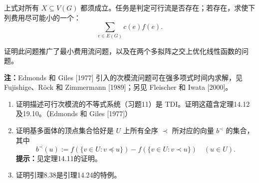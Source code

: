 上式对所有 $X\subseteq V(G)$ 都须成立。任务是判定可行流是否存在；若存在，求使下列费用尽可能小的一个：
\[\sum_{e\in E(G)}c(e)f(e).\]
\par 证明此问题推广了最小费用流问题，以及在两个多拟阵之交上优化线性函数的问题。
\par \textbf{注：}Edmonds 和 Giles [1977] 引入的次模流问题可在强多项式时间内求解，见 Fujishige、Röck 和 Zimmermann [1989]；另见 Fleischer 和 Iwata [2000]。
\begin{enumerate}[label=\arabic*.,start=12]
\item[$12.^*$] 证明描述可行次模流的不等式系统（习题11）是 TDI。证明这蕴含定理14.12及19.10。（Edmonds 和 Giles [1977]）
\setcounter{enumi}{12}
\item 证明基多面体的顶点集合恰好是 $U$ 上所有全序 $\prec$ 所对应的向量 $b^\prec$ 的集合，其中
\[b^\prec(u):=f(\{v\in U:v\preceq u\})-f(\{v\in U:v\prec u\})\quad(u\in U).\]
\textbf{提示：}见定理14.11的证明。
\item 证明引理8.38是引理14.24的特例。
\end{enumerate}


